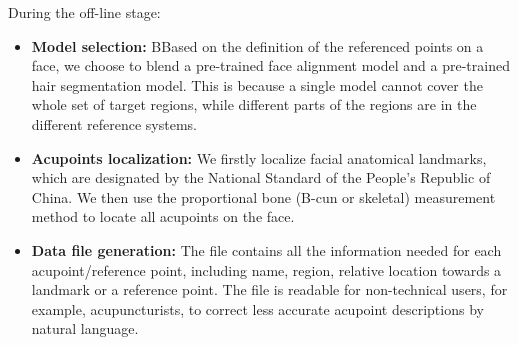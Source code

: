 During the off-line stage:
\begin{itemize}
\item \textbf{Model selection:} BBased on the definition of the referenced points on a face, we choose to blend a pre-trained face alignment model and a pre-trained hair segmentation model. This is because a single model cannot cover the whole set of target regions, while different parts of the regions are in the different reference systems.
\item \textbf{Acupoints localization:} We firstly localize facial anatomical landmarks, which are designated by the National Standard of the People’s Republic of China. We then use the proportional bone (B-cun or skeletal) measurement method to locate all acupoints on the face.
\item \textbf{Data file generation:} The file contains all the information needed for each acupoint/reference point, including name, region, relative location towards a landmark or a reference point. The file is readable for non-technical users, for example, acupuncturists, to correct less accurate acupoint descriptions by natural language.
\end{itemize}

